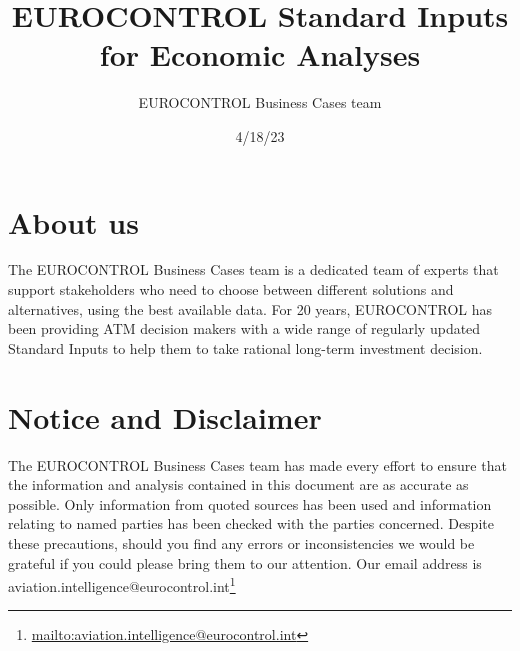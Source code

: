 \documentclass[
  11pt,
  a4paper,
]{book}
\title{EUROCONTROL Standard Inputs for Economic Analyses}
\author{EUROCONTROL Business Cases team}
\date{4/18/23}
\renewcommand*\contentsname{Table of contents}
\newcommand\contentsname{Table of contents}
\DeclareRobustCommand{\href}[2]{#2\footnote{\url{#1}}}
\begin{document}
\frontmatter
\maketitle
\ifdefined\Shaded\renewenvironment{Shaded}{\begin{tcolorbox}[breakable, frame hidden, sharp corners, enhanced, borderline west={3pt}{0pt}{shadecolor}, boxrule=0pt, interior hidden]}{\end{tcolorbox}}\fi

\renewcommand*\contentsname{Table of contents}
{
\hypersetup{linkcolor=}
\setcounter{tocdepth}{2}
\tableofcontents
}
\mainmatter
{}

\hypertarget{about-us}{%
\chapter*{About us}\label{about-us}}


The EUROCONTROL Business Cases team is a dedicated team of experts that
support stakeholders who need to choose between different solutions and
alternatives, using the best available data. For 20 years, EUROCONTROL
has been providing ATM decision makers with a wide range of regularly
updated Standard Inputs to help them to take rational long-term
investment decision.


\hypertarget{notice-and-disclaimer}{%
\chapter*{Notice and Disclaimer}\label{notice-and-disclaimer}}


The EUROCONTROL Business Cases team has made every effort to ensure that
the information and analysis contained in this document are as accurate
as possible. Only information from quoted sources has been used and
information relating to named parties has been checked with the parties
concerned. Despite these precautions, should you find any errors or
inconsistencies we would be grateful if you could please bring them to
our attention. Our email address is
\href{mailto:aviation.intelligence@eurocontrol.int}{aviation.intelligence@eurocontrol.int}
\end{document}
